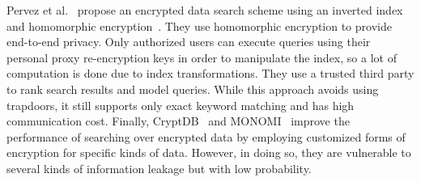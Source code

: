 Pervez et al.~\cite{zeehan} propose an encrypted data search scheme using an inverted index and homomorphic encryption~\cite{craig}.
They use homomorphic encryption to provide end-to-end privacy. Only
authorized users can execute queries using their personal proxy re-encryption keys in
order to manipulate the index, so a lot of computation is done due to index
transformations. They use a trusted third party to rank search results and model queries.
While this approach avoids using trapdoors, it still supports only
exact keyword matching and has high communication cost.
Finally, CryptDB~\cite{popa2011cryptdb} and MONOMI~\cite{tu2013processing} improve the performance of searching over encrypted data 
by employing customized forms of encryption for specific kinds of data.
However, in doing so, they are vulnerable to several kinds of information 
leakage but with low probability.
